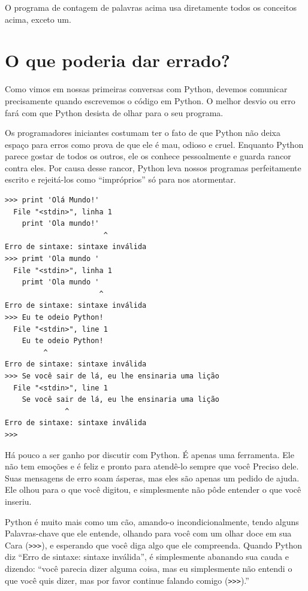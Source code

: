 O programa de contagem de palavras acima usa diretamente todos os conceitos acima, exceto um.

\section{O que poderia dar errado?} %

Como vimos em nossas primeiras conversas com Python, devemos comunicar precisamente quando escrevemos o código em Python. O melhor desvio ou erro fará com que Python desista de olhar para o seu programa.

Os programadores iniciantes costumam ter o fato de que Python não deixa espaço para erros como prova de que ele é mau, odioso e cruel. Enquanto Python parece gostar de todos os outros, ele os conhece pessoalmente e guarda rancor contra eles.  Por causa desse rancor, Python leva nossos programas perfeitamente escrito e rejeitá-los como ``impróprios'' só para nos atormentar.


\begin{verbatim}
>>> print 'Olá Mundo!'
  File "<stdin>", linha 1
    print 'Ola mundo!'
                       ^
Erro de sintaxe: sintaxe inválida 
>>> primt 'Ola mundo '
  File "<stdin>", linha 1
    primt 'Ola mundo '
                      ^
Erro de sintaxe: sintaxe inválida
>>> Eu te odeio Python!
  File "<stdin>", line 1
    Eu te odeio Python!
         ^
Erro de sintaxe: sintaxe inválida
>>> Se você sair de lá, eu lhe ensinaria uma lição
  File "<stdin>", line 1
    Se você sair de lá, eu lhe ensinaria uma lição
              ^
Erro de sintaxe: sintaxe inválida
>>> 
\end{verbatim}

%
Há pouco a ser ganho por discutir com Python.  É apenas uma ferramenta.
Ele não tem emoções e é feliz e pronto para atendê-lo sempre que você
Preciso dele.  Suas mensagens de erro soam ásperas, mas eles são apenas um pedido de ajuda.  Ele olhou para o que você digitou, e simplesmente não pôde entender o que você inseriu.

Python é muito mais como um cão, amando-o incondicionalmente, tendo alguns
Palavras-chave que ele entende, olhando para você com um olhar doce em sua
Cara ({\tt >>>}), e esperando que você diga algo que ele compreenda.
Quando Python diz ``Erro de sintaxe: sintaxe inválida'', é simplesmente abanando
sua cauda e dizendo: ``você parecia dizer alguma coisa, mas eu simplesmente não entendi o que você quis dizer, mas por favor continue falando comigo ({\tt >>>}).''

